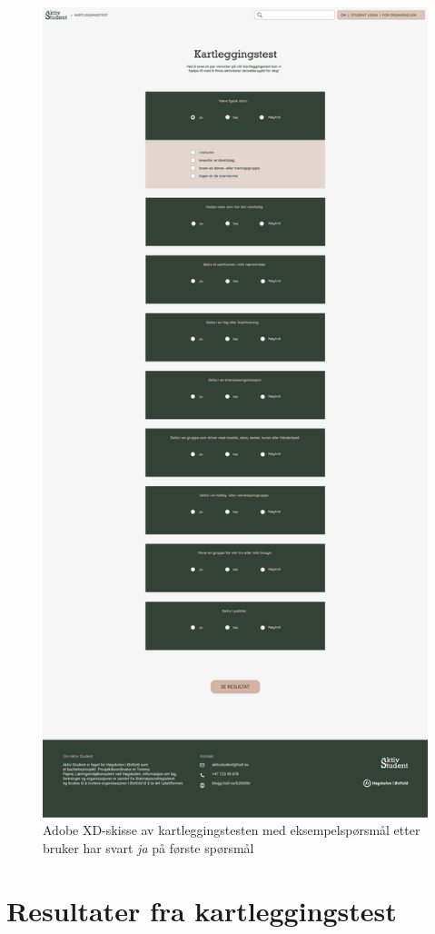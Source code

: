 \begin{figure}[H]
\centering
\includegraphics[width=.6\textwidth]{Illustrasjoner/Skisser-pdf/3.0/3-13-kartleggingstest-ved-svart-ja.pdf}
\caption{Adobe XD-skisse av kartleggingstesten med eksempelspørsmål etter bruker har svart {\em ja} på første spørsmål}
\label{vedlegg:3-13-kartlegging-svart-ja}
\end{figure}

\section{Resultater fra kartleggingstest}

